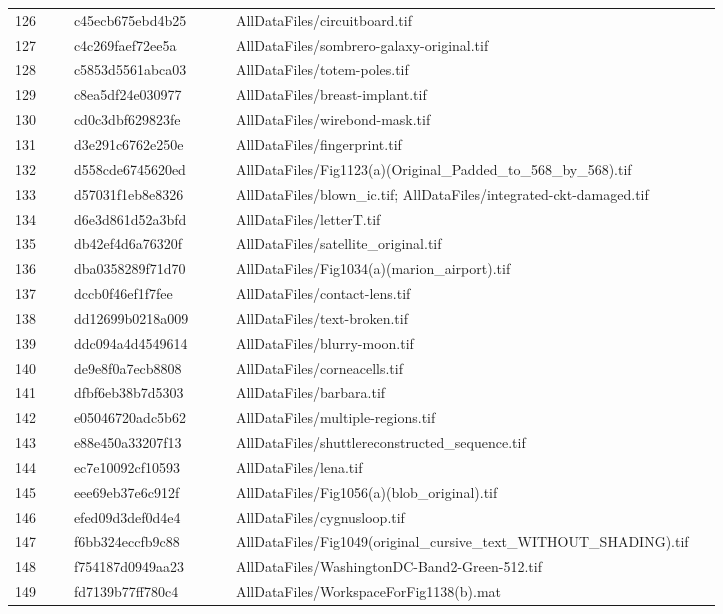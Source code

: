 \documentclass[11pt]{article}
\begin{document}
\begin{longtable}{p{0.08\linewidth}p{0.22\linewidth}p{0.66\linewidth}}
126 & c45ecb675ebd4b25 & AllDataFiles/circuitboard.tif \\
127 & c4c269faef72ee5a & AllDataFiles/sombrero-galaxy-original.tif \\
128 & c5853d5561abca03 & AllDataFiles/totem-poles.tif \\
129 & c8ea5df24e030977 & AllDataFiles/breast-implant.tif \\
130 & cd0c3dbf629823fe & AllDataFiles/wirebond-mask.tif \\
131 & d3e291c6762e250e & AllDataFiles/fingerprint.tif \\
132 & d558cde6745620ed & AllDataFiles/Fig1123(a)(Original\_Padded\_to\_568\_by\_568).tif \\
133 & d57031f1eb8e8326 & AllDataFiles/blown\_ic.tif; AllDataFiles/integrated-ckt-damaged.tif \\
134 & d6e3d861d52a3bfd & AllDataFiles/letterT.tif \\
135 & db42ef4d6a76320f & AllDataFiles/satellite\_original.tif \\
136 & dba0358289f71d70 & AllDataFiles/Fig1034(a)(marion\_airport).tif \\
137 & dccb0f46ef1f7fee & AllDataFiles/contact-lens.tif \\
138 & dd12699b0218a009 & AllDataFiles/text-broken.tif \\
139 & ddc094a4d4549614 & AllDataFiles/blurry-moon.tif \\
140 & de9e8f0a7ecb8808 & AllDataFiles/corneacells.tif \\
141 & dfbf6eb38b7d5303 & AllDataFiles/barbara.tif \\
142 & e05046720adc5b62 & AllDataFiles/multiple-regions.tif \\
143 & e88e450a33207f13 & AllDataFiles/shuttlereconstructed\_sequence.tif \\
144 & ec7e10092cf10593 & AllDataFiles/lena.tif \\
145 & eee69eb37e6c912f & AllDataFiles/Fig1056(a)(blob\_original).tif \\
146 & efed09d3def0d4e4 & AllDataFiles/cygnusloop.tif \\
147 & f6bb324eccfb9c88 & AllDataFiles/Fig1049(original\_cursive\_text\_WITHOUT\_SHADING).tif \\
148 & f754187d0949aa23 & AllDataFiles/WashingtonDC-Band2-Green-512.tif \\
149 & fd7139b77ff780c4 & AllDataFiles/WorkspaceForFig1138(b).mat \\
\bottomrule
\end{longtable}
\end{document}
